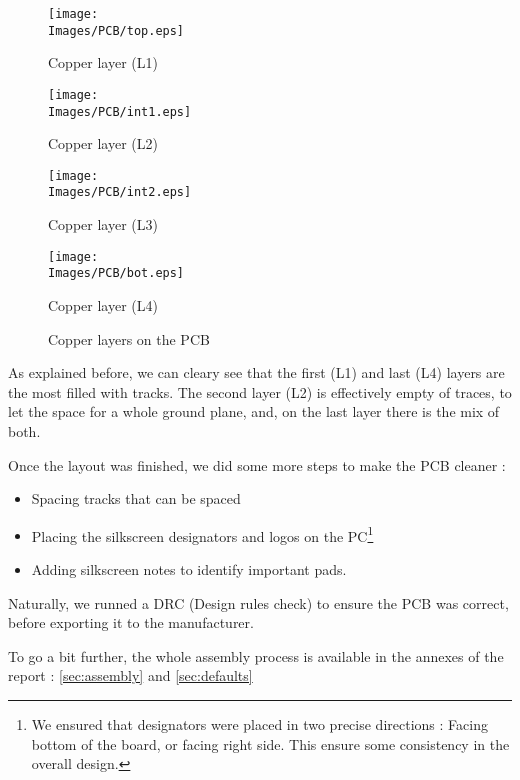 \begin{figure}[!hbt]
    \centering
    \begin{minipage}[c]{\SmallSchematicWidth}
        \centering
        \texttt{[image: \\Images/PCB/top.eps]}
        \caption*{Copper layer (L1)}
    \end{minipage}%
    \hfill%
    \begin{minipage}[c]{\SmallSchematicWidth}
        \centering
        \texttt{[image: \\Images/PCB/int1.eps]}
        \caption*{Copper layer (L2)}
    \end{minipage}%
    \hfill%
    \begin{minipage}[c]{\SmallSchematicWidth}
        \centering
        \texttt{[image: \\Images/PCB/int2.eps]}
        \caption*{Copper layer (L3)}
    \end{minipage}%
    \hfill%
    \begin{minipage}[c]{\SmallSchematicWidth}
        \centering
        \texttt{[image: \\Images/PCB/bot.eps]}
        \caption*{Copper layer (L4)}
    \end{minipage}
    \label{img:layout}
    \caption{Copper layers on the PCB}
\end{figure}
\FloatBarrier

As explained before, we can cleary see that the first (L1) and last (L4) layers
are the most filled with tracks. The second layer (L2) is effectively empty of
traces, to let the space for a whole ground plane, and, on the last layer there
is the mix of both.

Once the layout was finished, we did some more steps to make the PCB cleaner :

\begin{itemize}[noitemsep]
    \item   Spacing tracks that can be spaced
    \item   Placing the silkscreen designators and logos on the PC\footnote{
              We ensured that designators were placed in two precise directions :
              Facing bottom of the board, or facing right side. This ensure some
              consistency in the overall design.
          }
    \item   Adding silkscreen notes to identify important pads.
\end{itemize}

Naturally, we runned a DRC (Design rules check) to ensure the PCB was correct, before
exporting it to the manufacturer.

To go a bit further, the whole assembly process is available in the annexes of the
report : \ref{sec:assembly} and \ref{sec:defaults}